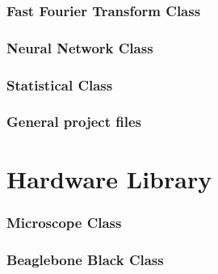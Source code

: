 \documentclass[11pt,fleqn,,a4paper,twoside,openright]{book}
\begin{document}
\subsection*{Fast Fourier Transform Class}


\newpage
\subsection*{Neural Network Class}


\newpage
\subsection*{Statistical Class}


\newpage
\subsection*{General project files}









\chapter{Hardware Library}
\subsection*{Microscope Class}


\newpage
\subsection*{Beaglebone Black Class}


\newpage
\end{document}
